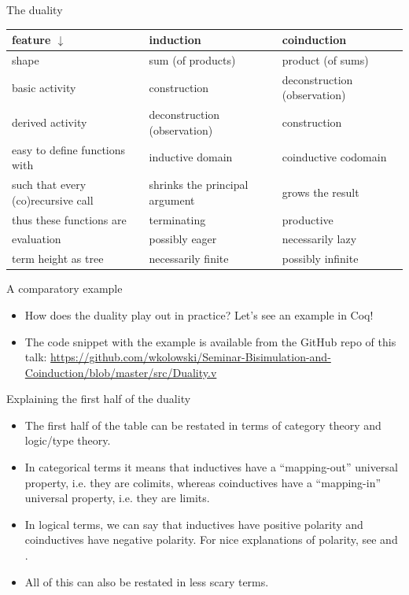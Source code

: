 \documentclass{beamer}
\begin{document}
\begin{frame}{The duality}
\begin{tabular}{ | p{3cm} | p{3cm} | p{3cm} | }
	\hline
	feature $\downarrow$ & induction & coinduction \\\hline
	shape & sum (of products) & product (of sums) \\\hline
	basic activity & construction & deconstruction (observation) \\\hline
	derived activity & deconstruction (observation) & construction \\\hline
	easy to define functions with & inductive domain & coinductive codomain \\\hline
	such that every (co)recursive call & shrinks the principal argument & grows the result \\\hline
	thus these functions are & terminating & productive \\\hline
	evaluation & possibly eager & necessarily lazy \\\hline
	term height as tree & necessarily finite & possibly infinite \\\hline
\end{tabular}
\end{frame}

\begin{frame}{A comparatory example}
\begin{itemize}
	\item How does the duality play out in practice? Let's see an example in Coq!
	\item The code snippet with the example is available from the GitHub repo of this talk: \url{https://github.com/wkolowski/Seminar-Bisimulation-and-Coinduction/blob/master/src/Duality.v}
\end{itemize}
\end{frame}

\begin{frame}{Explaining the first half of the duality}
\begin{itemize}
	\item The first half of the table can be restated in terms of category theory and logic/type theory.
	\item In categorical terms it means that inductives have a ``mapping-out'' universal property, i.e. they are colimits, whereas coinductives have a ``mapping-in'' universal property, i.e. they are limits.
	\item In logical terms, we can say that inductives have positive polarity and coinductives have negative polarity. For nice explanations of polarity, see \href{https://existentialtype.wordpress.com/2012/08/25/polarity-in-type-theory/}{\color{blue}{Polarity in Type Theory}} and \href{http://noamz.org/talks/logpolpro.pdf}{\color{blue}{Polarity in Proof Theory and Programming}}.
	\item All of this can also be restated in less scary terms.
\end{itemize}
\end{frame}
\end{document}
